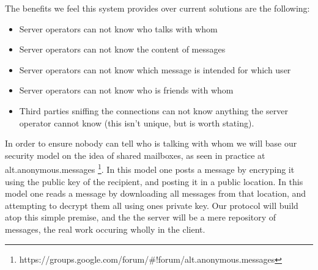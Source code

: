 The benefits we feel this system provides over current solutions are the
following:
\begin{itemize}
\item Server operators can not know who talks with whom
\item Server operators can not know the content of messages
\item Server operators can not know which message is intended for which user
\item Server operators can not know who is friends with whom
\item Third parties sniffing the connections can not know anything the server
operator cannot know (this isn't unique, but is worth stating).
\end{itemize}

In order to ensure nobody can tell who is talking with whom we will base our
security model on the idea of shared mailboxes, as seen in practice at
alt.anonymous.messages
\footnote{https://groups.google.com/forum/\#!forum/alt.anonymous.messages}.
In this model one posts a message by encryping it using the public key of the
recipient, and posting it in a public location. In this model one reads a
message by downloading all messages from that location, and attempting to
decrypt them all using ones private key. Our protocol will build atop this
simple premise, and the the server will be a mere repository of messages, the
real work occuring wholly in the client.

